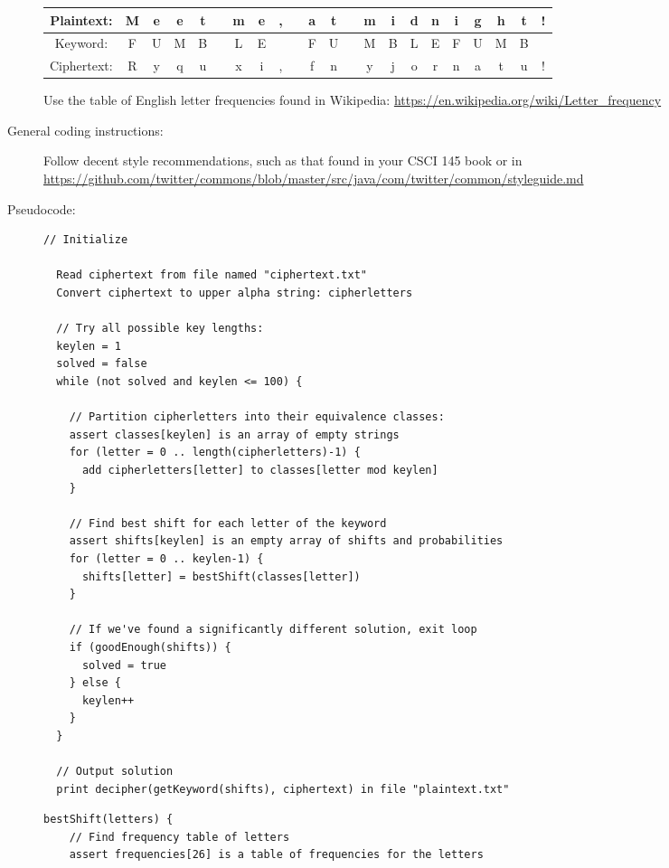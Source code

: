 \documentclass{article}
\begin{document}
\begin{description}
\begin{tabular}{|c|c|c|c|c|c|c|c|c|c|c|c|c|c|c|c|c|c|c|c|c|c|}
    \hline
  Plaintext: &  M&e&e&t& &m&e&,& &a&t& &m&i&d&n&i&g&h&t&!  \\\hline
  Keyword: &    F&U&M&B& &L&E& & &F&U& &M&B&L&E&F&U&M&B&  \\\hline
  Ciphertext: & R&y&q&u& &x&i&,& &f&n& &y&j&o&r&n&a&t&u&! \\\hline
\end{tabular}

  Use the table of English letter frequencies found in
  Wikipedia: {\url{https://en.wikipedia.org/wiki/Letter_frequency}}

  

  
\item[General coding instructions:]  Follow decent style
  recommendations,
  such as that found in your CSCI 145 book or in
  \url{https://github.com/twitter/commons/blob/master/src/java/com/twitter/common/styleguide.md}


  \newpage
  
\item[Pseudocode:]\mbox{}

\begin{Verbatim}[frame=single,label=Vigenere main]
  // Initialize

  Read ciphertext from file named "ciphertext.txt"
  Convert ciphertext to upper alpha string: cipherletters
  
  // Try all possible key lengths:
  keylen = 1
  solved = false
  while (not solved and keylen <= 100) {
    
    // Partition cipherletters into their equivalence classes:
    assert classes[keylen] is an array of empty strings
    for (letter = 0 .. length(cipherletters)-1) {
      add cipherletters[letter] to classes[letter mod keylen]
    }
    
    // Find best shift for each letter of the keyword
    assert shifts[keylen] is an empty array of shifts and probabilities
    for (letter = 0 .. keylen-1) {
      shifts[letter] = bestShift(classes[letter])
    }
    
    // If we've found a significantly different solution, exit loop
    if (goodEnough(shifts)) {
      solved = true
    } else {
      keylen++
    }
  }

  // Output solution
  print decipher(getKeyword(shifts), ciphertext) in file "plaintext.txt"
\end{Verbatim}


\begin{Verbatim}[frame=single,label=bestShift]
  bestShift(letters) {
    // Find frequency table of letters
    assert frequencies[26] is a table of frequencies for the letters
    

\end{Verbatim}
\end{description}
\end{document}
